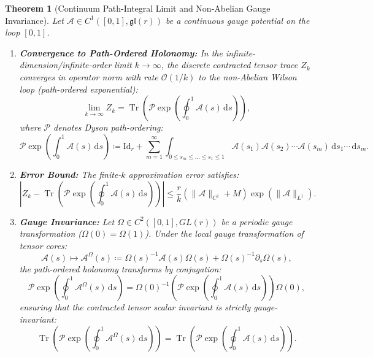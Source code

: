 \documentclass[11pt,a4paper,reqno]{amsart}
\newtheorem{theorem}{Theorem}[section]
\theoremstyle{definition}
\numberwithin{equation}{section}
\newcommand{\Id}{\mathrm{Id}}
\newcommand{\Tr}{\operatorname{Tr}}
\newcommand{\dif}{\,\mathrm{d}}
\begin{document}
\begin{theorem}[Continuum Path-Integral Limit and Non-Abelian Gauge Invariance]
\label{thm:continuous_path_integral}
Let $\mathcal{A} \in C^1([0, 1], \mathfrak{gl}(r))$ be a continuous gauge potential on the loop $[0, 1]$.
\begin{enumerate}[label=(\roman*)]
    \item \textbf{Convergence to Path-Ordered Holonomy:} In the infinite-dimension/infinite-order limit $k \to \infty$, the discrete contracted tensor trace $Z_k$ converges in operator norm with rate $\mathcal{O}(1/k)$ to the non-Abelian Wilson loop (path-ordered exponential):
    \begin{equation}
        \label{eq:path_ordered_limit}
        \lim_{k \to \infty} Z_k = \Tr\left( \mathcal{P} \exp\left( \oint_0^1 \mathcal{A}(s) \dif s \right) \right),
    \end{equation}
    where $\mathcal{P}$ denotes Dyson path-ordering:
    \begin{equation}
        \mathcal{P} \exp\left( \int_0^1 \mathcal{A}(s) \dif s \right) \coloneqq \Id_r + \sum_{m=1}^\infty \int_{0 \le s_m \le \dots \le s_1 \le 1} \mathcal{A}(s_1) \mathcal{A}(s_2) \cdots \mathcal{A}(s_m) \dif s_1 \cdots \dif s_m.
    \end{equation}
    \item \textbf{Error Bound:} The finite-$k$ approximation error satisfies:
    \begin{equation}
        \label{eq:dyson_error_bound}
        \left| Z_k - \Tr\left( \mathcal{P} \exp\left( \oint_0^1 \mathcal{A}(s) \dif s \right) \right) \right| \le \frac{r}{k} \left( \|\mathcal{A}\|_{C^1} + M \right) \exp\left( \|\mathcal{A}\|_{L^1} \right).
    \end{equation}
    \item \textbf{Gauge Invariance:} Let $\Omega \in C^2([0, 1], GL(r))$ be a periodic gauge transformation ($\Omega(0) = \Omega(1)$). Under the local gauge transformation of tensor cores:
    \begin{equation}
        \label{eq:continuous_gauge_field}
        \mathcal{A}(s) \mapsto \mathcal{A}^\Omega(s) \coloneqq \Omega(s)^{-1} \mathcal{A}(s) \Omega(s) + \Omega(s)^{-1} \partial_s \Omega(s),
    \end{equation}
    the path-ordered holonomy transforms by conjugation:
    \begin{equation}
        \mathcal{P} \exp\left( \oint_0^1 \mathcal{A}^\Omega(s) \dif s \right) = \Omega(0)^{-1} \left( \mathcal{P} \exp\left( \oint_0^1 \mathcal{A}(s) \dif s \right) \right) \Omega(0),
    \end{equation}
    ensuring that the contracted tensor scalar invariant is strictly gauge-invariant:
    \begin{equation}
        \Tr\left( \mathcal{P} \exp\left( \oint_0^1 \mathcal{A}^\Omega(s) \dif s \right) \right) = \Tr\left( \mathcal{P} \exp\left( \oint_0^1 \mathcal{A}(s) \dif s \right) \right).
    \end{equation}
\end{enumerate}
\end{theorem}
\end{document}
